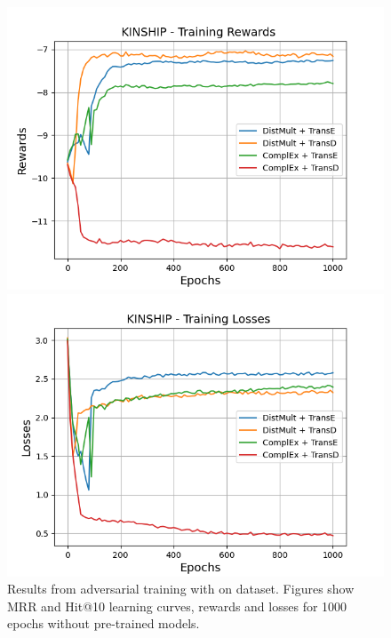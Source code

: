 \begin{figure}[H]
    \begin{minipage}{.45\textwidth}
      \centering
      \includegraphics[width=0.9\linewidth]{figures/results/gan_train/not_pretrained/uncertainty/max/entropy/kinship/1k_epochs/uncertainty_kinship_rew.png}
    \end{minipage}%
     \begin{minipage}{.45\textwidth}
      \centering
      \includegraphics[width=0.9\linewidth]{figures/results/gan_train/not_pretrained/uncertainty/max/entropy/kinship/1k_epochs/uncertainty_kinship_losses.png}
    \end{minipage}%
    \caption{Results from adversarial training with \usmax on \kinship dataset.
    Figures show MRR and Hit@10 learning curves, rewards and losses for 1000 epochs without pre-trained models.}
    \label{fig:gan_train_not_pretrained_usmax_kinship}
\end{figure}
